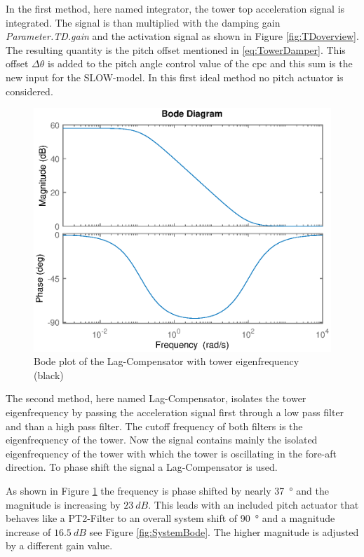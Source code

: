 In the first method, here named integrator, the tower top acceleration signal is integrated.
The signal is than multiplied with the damping gain \textit{Parameter.TD.gain} and the activation signal as shown in Figure \ref{fig:TDoverview}.
The resulting quantity is the pitch offset mentioned in \ref{eq:TowerDamper}.
This offset $\Delta\theta$ is added to the pitch angle control value of the \gls{cpc} and this sum is the new input for the SLOW-model. In this first ideal method no pitch actuator is considered.

\begin{figure}[h]
	\centering	
	\includegraphics[width=12cm]{Figures/BodeLagCompensator.eps}
	\caption{Bode plot of the Lag-Compensator with tower eigenfrequency (black)}
	\label{fig:BodeLag}
\end{figure}

The second method, here named Lag-Compensator, isolates the tower eigenfrequency by passing the acceleration signal first through a low pass filter and than a high pass filter. The cutoff frequency of both filters is the eigenfrequency of the tower. Now the signal contains mainly the isolated eigenfrequency of the tower with which the tower is oscillating in the fore-aft direction. To phase shift the signal a Lag-Compensator is used. 


As shown in Figure \ref{fig:BodeLag} the frequency is phase shifted by nearly \SI{37}{\degree} and the magnitude is increasing by $\SI{23}{dB}$. This leads with an included pitch actuator that behaves like a PT2-Filter to an overall system shift of \SI{90}{\degree} and a magnitude increase of $\SI{16.5}{dB}$ see Figure \ref{fig:SystemBode}. The higher magnitude is adjusted by a different gain value.

